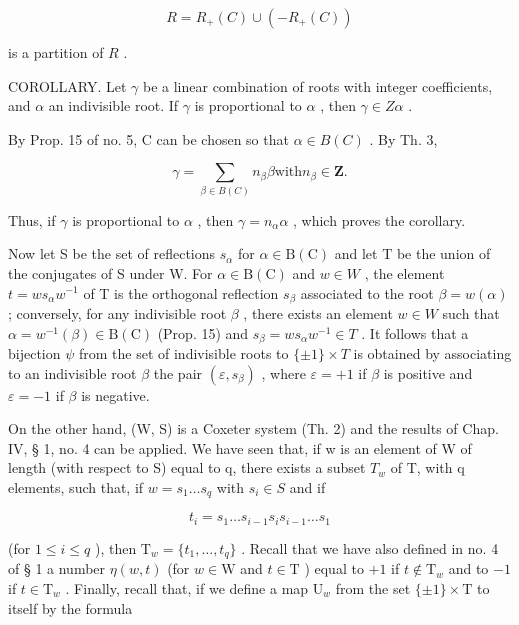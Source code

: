 \[
R = R _ {+} (C) \cup (- R _ {+} (C))
\]

is a partition of \(R\) .

COROLLARY. Let \(\gamma\) be a linear combination of roots with integer coefficients, and \(\alpha\) an indivisible root. If \(\gamma\) is proportional to \(\alpha\) , then \(\gamma \in Z\alpha\) .

By Prop. 15 of no. 5, C can be chosen so that \(\alpha \in B(C)\) . By Th. 3,

\[
\gamma = \sum_ {\beta \in B (C)} n _ {\beta} \beta \text {with} n _ {\beta} \in \mathbf {Z}.
\]

Thus, if \(\gamma\) is proportional to \(\alpha\) , then \(\gamma = n_{\alpha}\alpha\) , which proves the corollary.

Now let S be the set of reflections \(s_{\alpha}\) for \(\alpha \in \mathrm{B}(\mathrm{C})\) and let T be the union of the conjugates of S under W. For \(\alpha \in \mathrm{B}(\mathrm{C})\) and \(w \in W\) , the element \(t = ws_{\alpha}w^{-1}\) of T is the orthogonal reflection \(s_{\beta}\) associated to the root \(\beta = w(\alpha)\) ; conversely, for any indivisible root \(\beta\) , there exists an element \(w \in W\) such that \(\alpha = w^{-1}(\beta) \in \mathrm{B}(\mathrm{C})\) (Prop. 15) and \(s_{\beta} = ws_{\alpha}w^{-1} \in T\) . It follows that a bijection \(\psi\) from the set of indivisible roots to \(\{\pm1\} \times T\) is obtained by associating to an indivisible root \(\beta\) the pair \((\varepsilon, s_{\beta})\) , where \(\varepsilon = +1\) if \(\beta\) is positive and \(\varepsilon = -1\) if \(\beta\) is negative.

On the other hand, (W, S) is a Coxeter system (Th. 2) and the results of Chap. IV, § 1, no. 4 can be applied. We have seen that, if w is an element of W of length (with respect to S) equal to q, there exists a subset \(T_{w}\) of T, with q elements, such that, if \(w = s_{1} \ldots s_{q}\) with \(s_{i} \in S\) and if

\[
t _ {i} = s _ {1} \dots s _ {i - 1} s _ {i} s _ {i - 1} \dots s _ {1}
\]

(for \(1 \leqslant i \leqslant q\) ), then \(\mathrm{T}_w = \{t_1, \ldots, t_q\}\) . Recall that we have also defined in no. 4 of § 1 a number \(\eta(w, t)\) (for \(w \in \mathrm{W}\) and \(t \in \mathrm{T}\) ) equal to \(+1\) if \(t \notin \mathrm{T}_w\) and to \(-1\) if \(t \in \mathrm{T}_w\) . Finally, recall that, if we define a map \(\mathrm{U}_w\) from the set \(\{\pm 1\} \times \mathrm{T}\) to itself by the formula

